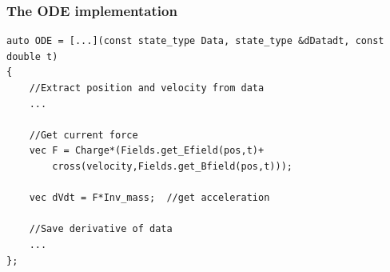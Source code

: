 \documentclass{beamer}
\begin{document}
\newif\ifadditional
\additionaltrue

\ifadditional
\begin{frame}[fragile]
\frametitle{The ODE implementation}
\begin{lstlisting}
auto ODE = [...](const state_type Data, state_type &dDatadt, const double t)
{
    //Extract position and velocity from data
    ...

    //Get current force
    vec F = Charge*(Fields.get_Efield(pos,t)+
        cross(velocity,Fields.get_Bfield(pos,t)));

    vec dVdt = F*Inv_mass;  //get acceleration

    //Save derivative of data
    ...
};
\end{lstlisting}
\end{frame}
\fi
\end{document}
